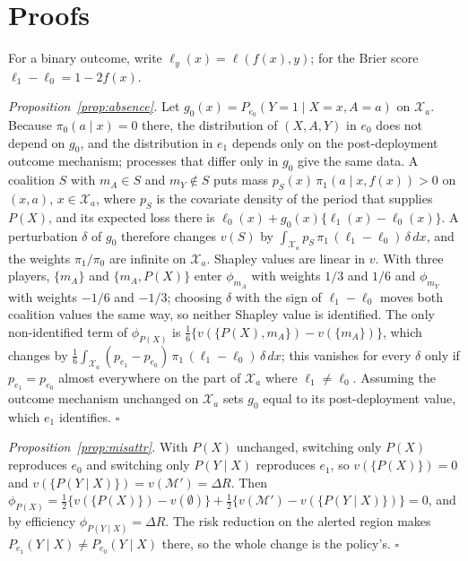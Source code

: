 \documentclass[letterpaper]{article} %
\begin{document}
\section{Proofs}
For a binary outcome, write $\ell_y(x) = \ell(f(x), y)$; for the Brier score
$\ell_1 - \ell_0 = 1 - 2f(x)$.

\emph{Proposition~\ref{prop:absence}.} Let
$g_0(x) = P_{e_0}(Y{=}1 \mid X = x, A = a)$ on $\mathcal{X}_a$. Because
$\pi_0(a \mid x) = 0$ there, the distribution of $(X, A, Y)$ in $e_0$ does not
depend on $g_0$, and the distribution in $e_1$ depends only on the
post-deployment outcome mechanism; processes that differ only in $g_0$ give the
same data. A coalition $S$ with $m_A \in S$ and $m_Y \notin S$ puts mass
$p_S(x)\, \pi_1(a \mid x, f(x)) > 0$ on $(x, a)$, $x \in \mathcal{X}_a$, where
$p_S$ is the covariate density of the period that supplies $P(X)$, and its
expected loss there is $\ell_0(x) + g_0(x)\{\ell_1(x) - \ell_0(x)\}$. A
perturbation $\delta$ of $g_0$ therefore changes $v(S)$ by
$\int_{\mathcal{X}_a} p_S\, \pi_1\, (\ell_1 - \ell_0)\, \delta\, dx$, and the
weights $\pi_1/\pi_0$ are infinite on $\mathcal{X}_a$. Shapley values are linear
in $v$. With three players, $\{m_A\}$ and $\{m_A, P(X)\}$ enter $\phi_{m_A}$
with weights $1/3$ and $1/6$ and $\phi_{m_Y}$ with weights $-1/6$ and $-1/3$;
choosing $\delta$ with the sign of $\ell_1 - \ell_0$ moves both coalition values
the same way, so neither Shapley value is identified. The only non-identified
term of $\phi_{P(X)}$ is $\frac{1}{6}\{v(\{P(X), m_A\}) - v(\{m_A\})\}$, which
changes by
$\frac{1}{6} \int_{\mathcal{X}_a} (p_{e_1} - p_{e_0})\, \pi_1\,
(\ell_1 - \ell_0)\, \delta\, dx$; this vanishes for every $\delta$ only if
$p_{e_1} = p_{e_0}$ almost everywhere on the part of $\mathcal{X}_a$ where
$\ell_1 \neq \ell_0$. Assuming the outcome mechanism unchanged on
$\mathcal{X}_a$ sets $g_0$ equal to its post-deployment value, which $e_1$
identifies. $\square$

\emph{Proposition~\ref{prop:misattr}.} With $P(X)$ unchanged, switching only
$P(X)$ reproduces $e_0$ and switching only $P(Y \mid X)$ reproduces $e_1$, so
$v(\{P(X)\}) = 0$ and $v(\{P(Y \mid X)\}) = v(\mathcal{M}') = \Delta R$. Then
$\phi_{P(X)} = \frac12\{v(\{P(X)\}) - v(\emptyset)\} +
\frac12\{v(\mathcal{M}') - v(\{P(Y \mid X)\})\} = 0$, and by efficiency
$\phi_{P(Y \mid X)} = \Delta R$. The risk reduction on the alerted region makes
$P_{e_1}(Y \mid X) \neq P_{e_0}(Y \mid X)$ there, so the whole change is the
policy's. $\square$
\end{document}
